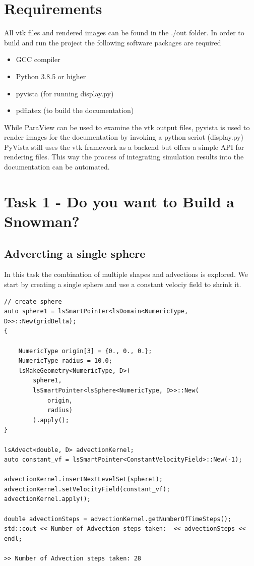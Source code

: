 \section{Requirements}
All vtk files and rendered images can be found in the ./out folder. 
In order to build and run the project the following software packages are required
\begin{itemize}
    \item GCC compiler
    \item Python 3.8.5 or higher
    \item pyvista (for running display.py)
    \item pdflatex (to build the documentation)
\end{itemize}

While ParaView can be used to examine the vtk output files, pyvista is used to render images for the documentation by  invoking a python scriot (display.py)
PyVista still uses the vtk framework as a backend but offers a simple API for rendering files. This way the process of integrating simulation results into the documentation can be automated.

\section{Task 1 - Do you want to Build a Snowman?}
\subsection{Advercting a single sphere}
In this task the combination of multiple shapes and advections is explored.
We start by creating a single sphere and use a constant velociy field to shrink it.

\begin{minipage}{\linewidth}
\begin{lstlisting}[caption=Sphere creation and advection]
// create sphere
auto sphere1 = lsSmartPointer<lsDomain<NumericType, D>>::New(gridDelta);
{

    NumericType origin[3] = {0., 0., 0.};
    NumericType radius = 10.0;
    lsMakeGeometry<NumericType, D>(
        sphere1,
        lsSmartPointer<lsSphere<NumericType, D>>::New(
            origin, 
            radius)
        ).apply(); 
}

lsAdvect<double, D> advectionKernel;
auto constant_vf = lsSmartPointer<ConstantVelocityField>::New(-1);

advectionKernel.insertNextLevelSet(sphere1);
advectionKernel.setVelocityField(constant_vf);
advectionKernel.apply(); 

double advectionSteps = advectionKernel.getNumberOfTimeSteps();
std::cout << Number of Advection steps taken:  << advectionSteps << endl;

>> Number of Advection steps taken: 28
\end{lstlisting}
\end{minipage}

